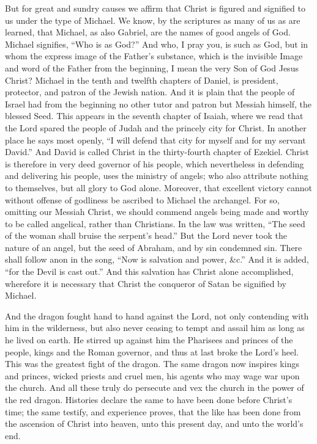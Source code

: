 But for great and sundry causes we affirm that Christ is figured and signified to us under the type of Michael. We know, by the scriptures as many of us as are learned, that Michael, as also Gabriel, are the names of good angels of God. Michael signifies, “Who is as God?” And who, I pray you, is such as God, but in whom the express image of the Father’s substance, which is the invisible Image and word of the Father from the beginning, I mean the very Son of God Jesus Christ? Michael in the tenth and twelfth chapters of Daniel, is president, protector, and patron of the Jewish nation. And it is plain that the people of Israel had from the beginning no other tutor and patron but Messiah himself, the blessed Seed. This appears in the seventh chapter of Isaiah, where we read that the Lord spared the people of Judah and the princely city for Christ. In another place he says most openly, “I will defend that city for myself and for my servant David.” And David is called Christ in the thirty-fourth chapter of Ezekiel. Christ is therefore in very deed governor of his people, which nevertheless in defending and delivering his people, uses the ministry of angels; who also attribute nothing to themselves, but all glory to God alone. Moreover, that excellent victory cannot without offense of godliness be ascribed to Michael the archangel. For so, omitting our Messiah Christ, we should commend angels being made and worthy to be called angelical, rather than Christians. In the law was written, “The seed of the woman shall bruise the serpent’s head.” But the Lord never took the nature of an angel, but the seed of Abraham, and by sin condemned sin. There shall follow anon in the song, “Now is salvation and power, \&c.” And it is added, “for the Devil is cast out.” And this salvation has Christ alone accomplished, wherefore it is necessary that Christ the conqueror of Satan be signified by Michael.

And the dragon fought hand to hand against the Lord, not only contending with him in the wilderness, but also never ceasing to tempt and assail him as long as he lived on earth. He stirred up against him the Pharisees and princes of the people, kings and the Roman governor, and thus at last broke the Lord’s heel. This was the greatest fight of the dragon. The same dragon now inspires kings and princes, wicked priests and cruel men, his agents who may wage war upon the church. And all these truly do persecute and vex the church in the power of the red dragon. Histories declare the same to have been done before Christ’s time; the same testify, and experience proves, that the like has been done from the ascension of Christ into heaven, unto this present day, and unto the world’s end.

